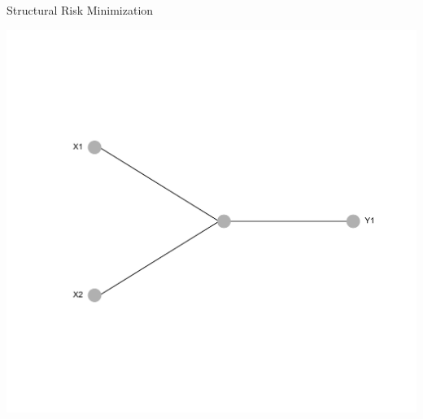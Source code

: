 \documentclass[11pt,compress,t,notes=noshow, xcolor=table]{beamer}
\begin{document}
\begin{frame} {Structural Risk Minimization}
{\begin{center}
\begin{minipage}{0.5\textwidth}
\includegraphics[width=\linewidth]{figure/nn_size_1.png}
\end{minipage}
\end{center}
}
\end{frame}
\end{document}
